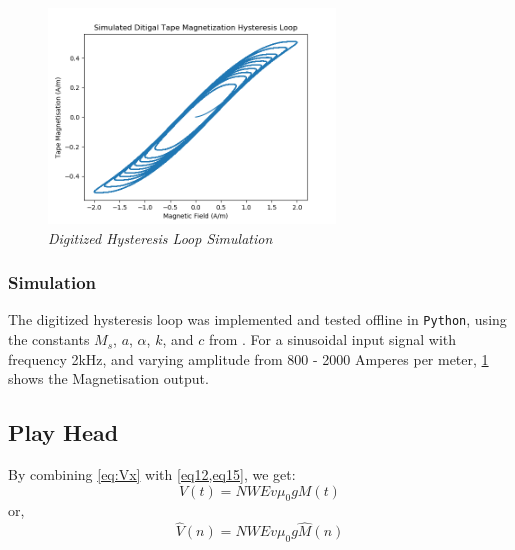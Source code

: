 \documentclass[twoside,a4paper]{article}
\begin{document}
\begin{figure}[ht]
    \center
    \includegraphics[width=3in]{../Simulations/Hysteresis/Sim2-M_H.png}
    \caption{\label{HysteresisSim}{\it Digitized Hysteresis Loop Simulation}}
\end{figure}
%
\subsubsection{Simulation}
The digitized hysteresis loop was implemented and tested offline
in \texttt{Python}, using the constants $M_s$, $a$, $\alpha$, $k$,
and $c$ from \cite{JilesAtherton1986}. For a sinusoidal input signal
with frequency 2kHz, and varying amplitude from 800 - 2000 Amperes per
meter, \cref{HysteresisSim} shows the Magnetisation output.

\subsection{Play Head}
By combining \cref{eq:Vx} with \cref{eq12,eq15}, we get:
\begin{equation}
    V(t) =  NWEv \mu_0  g M(t)
\end{equation}
%
or,
\begin{equation}
    \hat{V}(n) =  NWEv \mu_0  g \hat{M}(n)
    \label{eq:Vout}
\end{equation}
%
\end{document}
